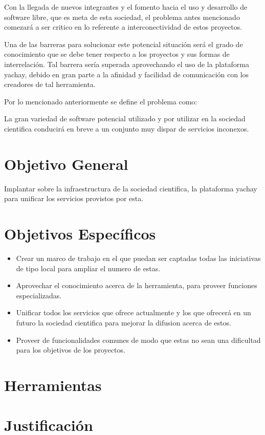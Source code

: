 \documentclass[letter,12pt]{article}
\begin{document}
Con la llegada de nuevos integrantes y el fomento hacia el uso y desarrollo de software libre, que
es meta de esta sociedad, el problema antes mencionado comezará a ser critico en lo referente a
interconectividad de estos proyectos.

Una de las barreras para solucionar este potencial situación será el grado de conocimiento que se
debe tener respecto a los proyectos y sus formas de interrelación. Tal barrera sería superada
aprovechando el uso de la plataforma yachay, debido en gran parte a la afinidad y facilidad de
comunicación con los creadores de tal herramienta.

Por lo mencionado anteriormente se define el problema como:

La gran variedad de software potencial utilizado y por utilizar en la sociedad cientifica conducirá 
en breve a un conjunto muy dispar de servicios inconexos.

\section{Objetivo General}
Implantar sobre la infraestructura de la sociedad cientifica, la plataforma yachay para unificar los servicios provistos por esta.

\section{Objetivos Específicos}
\begin{itemize}
\item Crear un marco de trabajo en el que puedan ser captadas todas las iniciativas de tipo local para ampliar el numero de estas.
\item Aprovechar el conocimiento acerca de la herramienta, para proveer funciones especializadas.
\item Unificar todos los servicios que ofrece actualmente y los que ofrecerá en un futuro la
sociedad cientifica para mejorar la difusion acerca de estos.
\item Proveer de funcionalidades comunes de modo que estas no sean una dificultad para los objetivos de los proyectos.
\end{itemize}

\section{Herramientas}

\section{Justificación}

\begin{thebibliography}{99}
\end{thebibliography}
\end{document}
